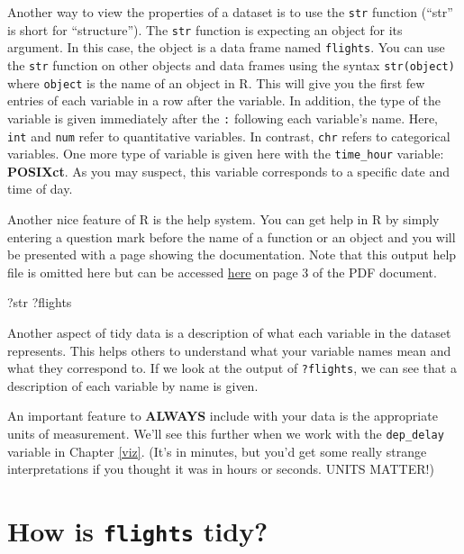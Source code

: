 \documentclass[]{tufte-book}
\newenvironment{Shaded}{\begin{snugshade}}{\end{snugshade}}
\newcommand{\NormalTok}[1]{{#1}}
\begin{document}
Another way to view the properties of a dataset is to use the
\texttt{str} function (``str'' is short for ``structure''). The
\texttt{str} function is expecting an object for its argument. In this
case, the object is a data frame named \texttt{flights}. You can use the
\texttt{str} function on other objects and data frames using the syntax
\texttt{str(object)} where \texttt{object} is the name of an object in
R. This will give you the first few entries of each variable in a row
after the variable. In addition, the type of the variable is given
immediately after the \texttt{:} following each variable's name. Here,
\texttt{int} and \texttt{num} refer to quantitative variables. In
contrast, \texttt{chr} refers to categorical variables. One more type of
variable is given here with the \texttt{time\_hour} variable:
\textbf{POSIXct}. As you may suspect, this variable corresponds to a
specific date and time of day.

Another nice feature of R is the help system. You can get help in R by
simply entering a question mark before the name of a function or an
object and you will be presented with a page showing the documentation.
Note that this output help file is omitted here but can be accessed
\href{https://cran.r-project.org/web/packages/nycflights13/nycflights13.pdf}{here}
on page 3 of the PDF document.

\begin{Shaded}
\begin{Highlighting}[]
\NormalTok{?str}
\NormalTok{?flights}
\end{Highlighting}
\end{Shaded}

Another aspect of tidy data is a description of what each variable in
the dataset represents. This helps others to understand what your
variable names mean and what they correspond to. If we look at the
output of \texttt{?flights}, we can see that a description of each
variable by name is given.

An important feature to \textbf{ALWAYS} include with your data is the
appropriate units of measurement. We'll see this further when we work
with the \texttt{dep\_delay} variable in Chapter \ref{viz}. (It's in
minutes, but you'd get some really strange interpretations if you
thought it was in hours or seconds. UNITS MATTER!)

\section{\texorpdfstring{How is \texttt{flights}
tidy?}{How is flights tidy?}}\label{how-is-flights-tidy}
\end{document}
